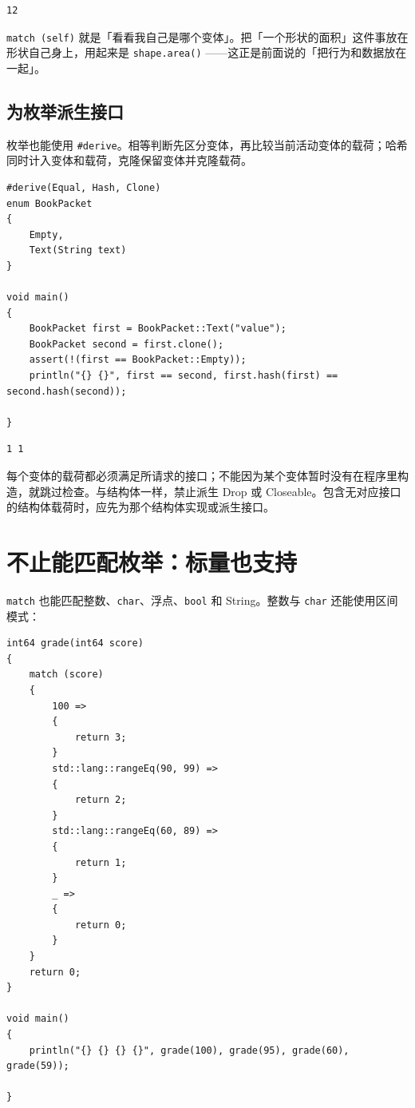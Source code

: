 \par
\medskip
\begin{lstlisting}[style=out]
12
\end{lstlisting}
\par
\medskip

\texttt{match (\allowbreak{}self)\allowbreak{}} 就是「看看我自己是哪个变体」。把「一个形状的面积」这件事放在形状自己身上，用起来是 \texttt{shape.\allowbreak{}area(\allowbreak{})\allowbreak{}} ——这正是前面说的「把行为和数据放在一起」。

\subsection*{为枚举派生接口}

枚举也能使用 \texttt{\#derive}。相等判断先区分变体，再比较当前活动变体的载荷；哈希同时计入变体和载荷，克隆保留变体并克隆载荷。

\par
\medskip
\begin{lstlisting}[style=chali]
#derive(Equal, Hash, Clone)
enum BookPacket
{
    Empty,
    Text(String text)
}

void main()
{
    BookPacket first = BookPacket::Text("value");
    BookPacket second = first.clone();
    assert(!(first == BookPacket::Empty));
    println("{} {}", first == second, first.hash(first) == second.hash(second));

}
\end{lstlisting}
\par
\medskip

\par
\medskip
\begin{lstlisting}[style=out]
1 1
\end{lstlisting}
\par
\medskip

每个变体的载荷都必须满足所请求的接口；不能因为某个变体暂时没有在程序里构造，就跳过检查。与结构体一样，禁止派生 Drop 或 Closeable。包含无对应接口的结构体载荷时，应先为那个结构体实现或派生接口。

\section{不止能匹配枚举：标量也支持}

\texttt{match} 也能匹配整数、\texttt{char}、浮点、\texttt{bool} 和 String。整数与 \texttt{char} 还能使用区间模式：

\par
\medskip
\begin{lstlisting}[style=chali]
int64 grade(int64 score)
{
    match (score)
    {
        100 =>
        {
            return 3;
        }
        std::lang::rangeEq(90, 99) =>
        {
            return 2;
        }
        std::lang::rangeEq(60, 89) =>
        {
            return 1;
        }
        _ =>
        {
            return 0;
        }
    }
    return 0;
}

void main()
{
    println("{} {} {} {}", grade(100), grade(95), grade(60), grade(59));

}
\end{lstlisting}
\par
\medskip

